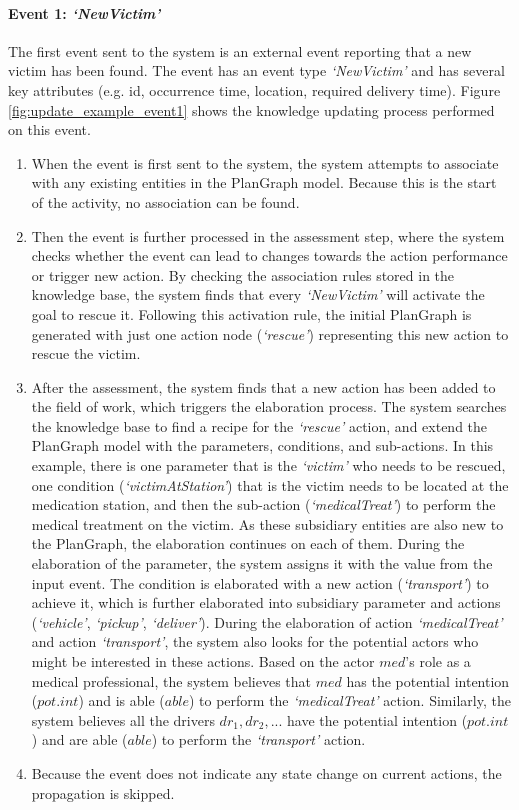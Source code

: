 \paragraph*{Event 1: \emph{`NewVictim'}} %
\label{par:event_1_emph_newvictim}
The first event sent to the system is an external event reporting that a new victim has been found. The event has an event type \emph{`NewVictim'} and has several key attributes (e.g. id, occurrence time, location, required delivery time). Figure \ref{fig:update_example_event1} shows the knowledge updating process performed on this event.

\begin{enumerate}
	\item When the event is first sent to the system, the system attempts to associate with any existing entities in the PlanGraph model. Because this is the start of the activity, no association can be found. 
	\item Then the event is further processed in the assessment step, where the system checks whether the event can lead to changes towards the action performance or trigger new action. By checking the association rules stored in the knowledge base, the system finds that every \emph{`NewVictim'} will activate the goal to rescue it. Following this activation rule, the initial PlanGraph is generated with just one action node (\emph{`rescue'}) representing this new action to rescue the victim.
	\item After the assessment, the system finds that a new action has been added to the field of work, which triggers the elaboration process. The system searches the knowledge base to find a recipe for the \emph{`rescue'} action, and extend the PlanGraph model with the parameters, conditions, and sub-actions. In this example, there is one parameter that is the \emph{`victim'} who needs to be rescued, one condition (\emph{`victimAtStation'}) that is the victim needs to be located at the medication station, and then the sub-action (\emph{`medicalTreat'}) to perform the medical treatment on the victim. As these subsidiary entities are also new to the PlanGraph, the elaboration continues on each of them. During the elaboration of the parameter, the system assigns it with the value from the input event. The condition is elaborated with a new action (\emph{`transport'}) to achieve it, which is further elaborated into subsidiary parameter and actions (\emph{`vehicle'}, \emph{`pickup'}, \emph{`deliver'}). During the elaboration of action \emph{`medicalTreat'} and action \emph{`transport'}, the system also looks for the potential actors who might be interested in these actions. Based on the actor $med$'s role as a medical professional, the system believes that $med$ has the potential intention ($pot.int$) and is able ($able$) to perform the \emph{`medicalTreat'} action. Similarly, the system believes all the drivers $dr_1, dr_2, ...$ have the potential intention ($pot.int$) and are able ($able$) to perform the \emph{`transport'} action.
	\item Because the event does not indicate any state change on current actions, the propagation is skipped.
\end{enumerate}

